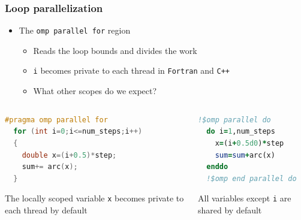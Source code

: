 \documentclass[xcolor=table,10pt,final]{beamer}
\begin{document}
\begin{frame}[fragile]
  \frametitle{Loop parallelization}
  \begin{itemize}
    \item The {\tt omp parallel for} region
      \begin{itemize}
	\item Reads the loop bounds and divides the work
	\item {\tt i} becomes private to each thread in {\tt Fortran} and {\tt C++}
	\item What other scopes do we expect?
      \end{itemize}
  \end{itemize}
  \begin{columns}[T]
    \begin{column}{0.5\textwidth}
  \begin{lstlisting}[language=C++,basicstyle=\footnotesize]
#pragma omp parallel for
  for (int i=0;i<=num_steps;i++)
  {
    double x=(i+0.5)*step;
    sum+= arc(x);
  }
  \end{lstlisting}
  {\footnotesize The locally scoped variable {\tt x} becomes private to each thread by default}
\end{column}
\begin{column}{0.5\textwidth}
  \begin{lstlisting}[language=Fortran,basicstyle=\footnotesize]
  !$omp parallel do
  do i=1,num_steps
    x=(i+0.5d0)*step
    sum=sum+arc(x)
  enddo
  !$omp end parallel do
  \end{lstlisting}
  {\footnotesize All variables except {\tt i} are shared by default}
\end{column}
\end{columns}
\end{frame}
\end{document}
